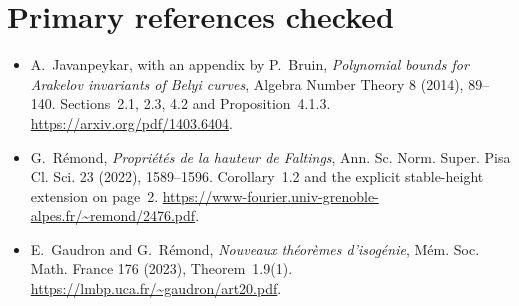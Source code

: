 \documentclass[11pt]{article}
\begin{document}
\section*{Primary references checked}
\begin{itemize}
\item A.~Javanpeykar, with an appendix by P.~Bruin,
\emph{Polynomial bounds for Arakelov invariants of Belyi curves},
Algebra Number Theory 8 (2014), 89--140.
Sections~2.1, 2.3, 4.2 and Proposition~4.1.3.
\url{https://arxiv.org/pdf/1403.6404}.
\item G.~R\'emond, \emph{Propri\'et\'es de la hauteur de Faltings},
Ann. Sc. Norm. Super. Pisa Cl. Sci. 23 (2022), 1589--1596.
Corollary~1.2 and the explicit stable-height extension on page~2.
\url{https://www-fourier.univ-grenoble-alpes.fr/~remond/2476.pdf}.
\item E.~Gaudron and G.~R\'emond,
\emph{Nouveaux th\'eor\`emes d'isog\'enie},
M\'em. Soc. Math. France 176 (2023), Theorem~1.9(1).
\url{https://lmbp.uca.fr/~gaudron/art20.pdf}.
\end{itemize}
\end{document}
